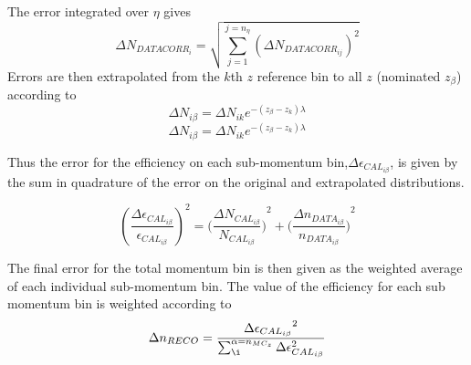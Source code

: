 The error integrated over $\eta$ gives
\begin{equation}
\Delta N_{DATACORR_{i}}= \sqrt{\sum_{j=1}^{j=n_{\eta}} {(\Delta N_{DATACORR_{ij}})}^{2}}
\label{eq:sumqd}
\end{equation}
Errors are then extrapolated from the $k$th $z$ reference bin to all $z$ (nominated $z_{\beta}$) according to
\begin{equation}
\Delta N_{i\beta} = \Delta N_{ik}e^{-(z_{\beta}-z_{k})\lambda}
\end{equation}
\begin{equation}
\Delta N_{i\beta} = \Delta N_{ik}e^{-(z_{\beta}-z_{k})\lambda}
\end{equation}

Thus the error for the efficiency on each sub-momentum bin,$\Delta\epsilon_{CAL_{i\beta}}$, is given by the sum in quadrature of the error on the original and extrapolated distributions.

\begin{equation}
\label{eq:efferr}
{(\frac{\Delta\epsilon_{CAL_{i\beta}}}{\epsilon_{CAL_{i\beta}}})}^{2}=({\frac{\Delta N_{CAL_{i\beta}}}{N_{CAL_{i\beta}}})}^{2}+({\frac{\Delta n_{DATA_{i\beta}}}{n_{DATA_{i\beta}}})}^{2} %
\end{equation}

The final error for the total momentum bin is then given as the weighted average of each individual sub-momentum bin. The value of the efficiency for each sub momentum bin is weighted according to 
 \begin{equation}
\label{eq:weightav}
 \Delta n_{RECO}= \frac{{\Delta\epsilon_{CAL_{i\beta}}}^{2}}{\sum_{\i}^{\alpha=n_{MC_z}}{\Delta\epsilon_{CAL_{i\beta}}^{2}}}
 \end{equation}
